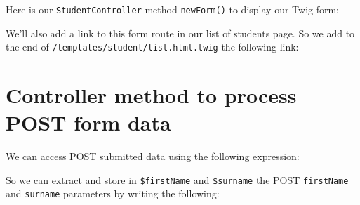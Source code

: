 \documentclass[a4paperpaper,openright]{book}
\newenvironment{Shaded}{}{}
\newcommand{\CommentTok}[1]{\textcolor[rgb]{0.38,0.63,0.69}{\textit{#1}}}
\newcommand{\KeywordTok}[1]{\textcolor[rgb]{0.00,0.44,0.13}{\textbf{#1}}}
\newcommand{\NormalTok}[1]{#1}
\newcommand{\OtherTok}[1]{\textcolor[rgb]{0.00,0.44,0.13}{#1}}
\newcommand{\StringTok}[1]{\textcolor[rgb]{0.25,0.44,0.63}{#1}}
\begin{document}
Here is our \texttt{StudentController} method \texttt{newForm()} to
display our Twig form:

\begin{Shaded}
\end{Shaded}

We'll also add a link to this form route in our list of students page.
So we add to the end of \texttt{/templates/student/list.html.twig} the
following link:

\begin{Shaded}
\end{Shaded}

\hypertarget{controller-method-to-process-post-form-data}{%
\section{Controller method to process POST form
data}\label{controller-method-to-process-post-form-data}}

We can access POST submitted data using the following expression:

\begin{Shaded}
\end{Shaded}

So we can extract and store in \texttt{\$firstName} and
\texttt{\$surname} the POST \texttt{firstName} and \texttt{surname}
parameters by writing the following:
\end{document}
